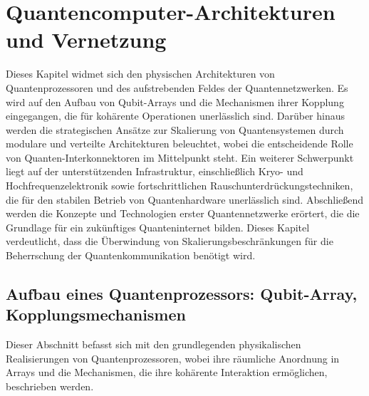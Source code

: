 


\section{Quantencomputer-Architekturen und Vernetzung}
Dieses Kapitel widmet sich den physischen Architekturen von Quantenprozessoren und des aufstrebenden Feldes der Quantennetzwerken. Es wird auf den Aufbau von Qubit-Arrays und die Mechanismen ihrer Kopplung eingegangen, die für kohärente Operationen unerlässlich sind. Darüber hinaus werden die strategischen Ansätze zur Skalierung von Quantensystemen durch modulare und verteilte Architekturen beleuchtet, wobei die entscheidende Rolle von Quanten-Interkonnektoren im Mittelpunkt steht. Ein weiterer Schwerpunkt liegt auf der unterstützenden Infrastruktur, einschließlich Kryo- und Hochfrequenzelektronik sowie fortschrittlichen Rauschunterdrückungstechniken, die für den stabilen Betrieb von Quantenhardware unerlässlich sind. Abschließend werden die Konzepte und Technologien erster Quantennetzwerke erörtert, die die Grundlage für ein zukünftiges Quanteninternet bilden. Dieses Kapitel verdeutlicht, dass die Überwindung von Skalierungsbeschränkungen für die Beherrschung der Quantenkommunikation benötigt wird.
\subsection{Aufbau eines Quantenprozessors: Qubit-Array, Kopplungsmechanismen}
Dieser Abschnitt befasst sich mit den grundlegenden physikalischen Realisierungen von Quantenprozessoren, wobei ihre räumliche Anordnung in Arrays und die  Mechanismen, die ihre kohärente Interaktion ermöglichen, beschrieben werden.
